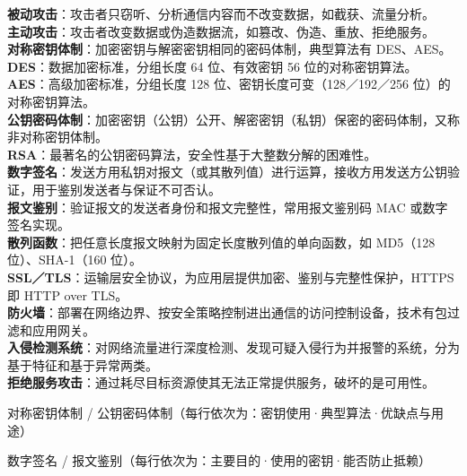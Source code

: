 \documentclass[a4paper,11pt]{article}
\begin{document}
\begin{keyterms}
\textbf{被动攻击}：攻击者只窃听、分析通信内容而不改变数据，如截获、流量分析。\\
\textbf{主动攻击}：攻击者改变数据或伪造数据流，如篡改、伪造、重放、拒绝服务。\\
\textbf{对称密钥体制}：加密密钥与解密密钥相同的密码体制，典型算法有 DES、AES。\\
\textbf{DES}：数据加密标准，分组长度 64 位、有效密钥 56 位的对称密钥算法。\\
\textbf{AES}：高级加密标准，分组长度 128 位、密钥长度可变（128／192／256 位）的对称密钥算法。\\
\textbf{公钥密码体制}：加密密钥（公钥）公开、解密密钥（私钥）保密的密码体制，又称非对称密钥体制。\\
\textbf{RSA}：最著名的公钥密码算法，安全性基于大整数分解的困难性。\\
\textbf{数字签名}：发送方用私钥对报文（或其散列值）进行运算，接收方用发送方公钥验证，用于鉴别发送者与保证不可否认。\\
\textbf{报文鉴别}：验证报文的发送者身份和报文完整性，常用报文鉴别码 MAC 或数字签名实现。\\
\textbf{散列函数}：把任意长度报文映射为固定长度散列值的单向函数，如 MD5（128 位）、SHA-1（160 位）。\\
\textbf{SSL／TLS}：运输层安全协议，为应用层提供加密、鉴别与完整性保护，HTTPS 即 HTTP over TLS。\\
\textbf{防火墙}：部署在网络边界、按安全策略控制进出通信的访问控制设备，技术有包过滤和应用网关。\\
\textbf{入侵检测系统}：对网络流量进行深度检测、发现可疑入侵行为并报警的系统，分为基于特征和基于异常两类。\\
\textbf{拒绝服务攻击}：通过耗尽目标资源使其无法正常提供服务，破坏的是可用性。
\end{keyterms}

\begin{contrast}{对称密钥体制 / 公钥密码体制（每行依次为：密钥使用·典型算法·优缺点与用途）}
\end{contrast}

\begin{contrast}{数字签名 / 报文鉴别（每行依次为：主要目的·使用的密钥·能否防止抵赖）}
\end{contrast}
\end{document}
